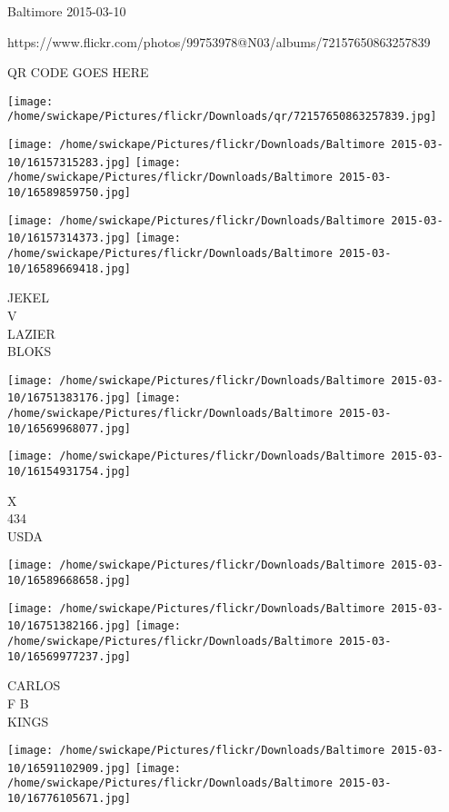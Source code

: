 \documentclass[10pt,letterpaper]{article}
\begin{document}
Baltimore 2015-03-10

https://www.flickr.com/photos/99753978@N03/albums/72157650863257839

QR CODE GOES HERE

\texttt{[image: /home/swickape/Pictures/flickr/Downloads/qr/72157650863257839.jpg]}
\pagebreak

\texttt{[image: /home/swickape/Pictures/flickr/Downloads/Baltimore 2015-03-10/16157315283.jpg]}
\texttt{[image: /home/swickape/Pictures/flickr/Downloads/Baltimore 2015-03-10/16589859750.jpg]}

\texttt{[image: /home/swickape/Pictures/flickr/Downloads/Baltimore 2015-03-10/16157314373.jpg]}
\texttt{[image: /home/swickape/Pictures/flickr/Downloads/Baltimore 2015-03-10/16589669418.jpg]}

JEKEL\\
V\\
LAZIER\\
BLOKS\\
\pagebreak

\texttt{[image: /home/swickape/Pictures/flickr/Downloads/Baltimore 2015-03-10/16751383176.jpg]}
\texttt{[image: /home/swickape/Pictures/flickr/Downloads/Baltimore 2015-03-10/16569968077.jpg]}

\texttt{[image: /home/swickape/Pictures/flickr/Downloads/Baltimore 2015-03-10/16154931754.jpg]}

X\\
434\\
USDA\\
\pagebreak

\texttt{[image: /home/swickape/Pictures/flickr/Downloads/Baltimore 2015-03-10/16589668658.jpg]}

\vspace{0.25in}
\texttt{[image: /home/swickape/Pictures/flickr/Downloads/Baltimore 2015-03-10/16751382166.jpg]}
\texttt{[image: /home/swickape/Pictures/flickr/Downloads/Baltimore 2015-03-10/16569977237.jpg]}

CARLOS\\
F B\\
KINGS\\
\pagebreak

\texttt{[image: /home/swickape/Pictures/flickr/Downloads/Baltimore 2015-03-10/16591102909.jpg]}
\texttt{[image: /home/swickape/Pictures/flickr/Downloads/Baltimore 2015-03-10/16776105671.jpg]}
\end{document}
